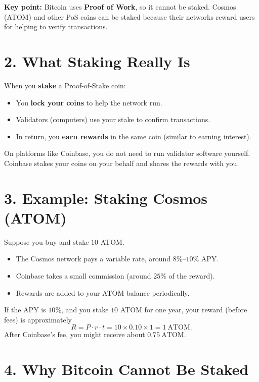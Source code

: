 \documentclass{article}
\begin{document}
\medskip

\noindent
\textbf{Key point:} Bitcoin uses \textbf{Proof of Work}, so it cannot be staked.  
Cosmos (ATOM) and other PoS coins can be staked because their networks reward users for helping to verify transactions.

\bigskip

\section*{2. What Staking Really Is}

When you \textbf{stake} a Proof-of-Stake coin:
\begin{itemize}
  \item You \textbf{lock your coins} to help the network run.
  \item Validators (computers) use your stake to confirm transactions.
  \item In return, you \textbf{earn rewards} in the same coin (similar to earning interest).
\end{itemize}

On platforms like Coinbase, you do not need to run validator software yourself.  
Coinbase stakes your coins on your behalf and shares the rewards with you.

\bigskip

\section*{3. Example: Staking Cosmos (ATOM)}

Suppose you buy and stake \(10\) ATOM.

\begin{itemize}
  \item The Cosmos network pays a variable rate, around \(8\% \text{--} 10\%\) APY.
  \item Coinbase takes a small commission (around \(25\%\) of the reward).
  \item Rewards are added to your ATOM balance periodically.
\end{itemize}

\noindent
If the APY is \(10\%\), and you stake \(10\) ATOM for one year, your reward (before fees) is approximately
\[
R = P \cdot r \cdot t = 10 \times 0.10 \times 1 = 1~\text{ATOM}.
\]
After Coinbase's fee, you might receive about \(0.75~\text{ATOM}\).

\bigskip

\section*{4. Why Bitcoin Cannot Be Staked}
\end{document}
